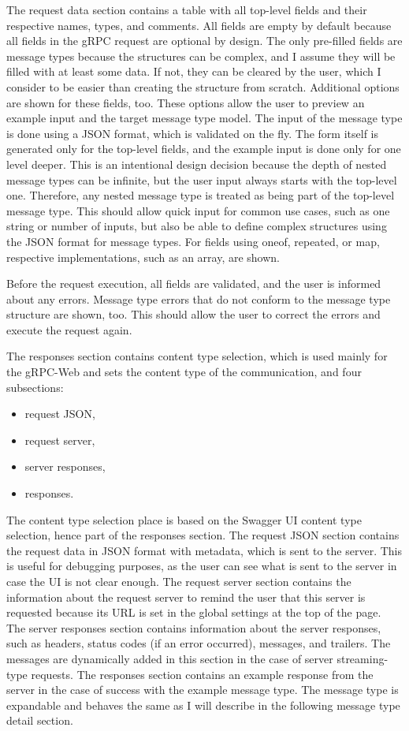 The request data section contains a table with all top-level fields and their respective names, types, and comments.
All fields are empty by default because all fields in the gRPC request are optional by design.
The only pre-filled fields are message types because the structures can be complex, and I assume they will be filled with at least some data.
If not, they can be cleared by the user, which I consider to be easier than creating the structure from scratch.
Additional options are shown for these fields, too.
These options allow the user to preview an example input and the target message type model.
The input of the message type is done using a JSON format, which is validated on the fly.
The form itself is generated only for the top-level fields, and the example input is done only for one level deeper.
This is an intentional design decision because the depth of nested message types can be infinite, but the user input always starts with the top-level one.
Therefore, any nested message type is treated as being part of the top-level message type.
This should allow quick input for common use cases, such as one string or number of inputs, but also be able to define complex structures using the JSON format for message types.
For fields using oneof, repeated, or map, respective implementations, such as an array, are shown.

Before the request execution, all fields are validated, and the user is informed about any errors.
Message type errors that do not conform to the message type structure are shown, too.
This should allow the user to correct the errors and execute the request again.

The responses section contains content type selection, which is used mainly for the gRPC-Web and sets the content type of the communication, and four subsections:
\begin{itemize}
    \item request JSON,
    \item request server,
    \item server responses,
    \item responses.
\end{itemize}

The content type selection place is based on the Swagger UI content type selection, hence part of the responses section.
The request JSON section contains the request data in JSON format with metadata, which is sent to the server.
This is useful for debugging purposes, as the user can see what is sent to the server in case the UI is not clear enough.
The request server section contains the information about the request server to remind the user that this server is requested because its URL is set in the global settings at the top of the page.
The server responses section contains information about the server responses, such as headers, status codes (if an error occurred), messages, and trailers.
The messages are dynamically added in this section in the case of server streaming-type requests.
The responses section contains an example response from the server in the case of success with the example message type.
The message type is expandable and behaves the same as I will describe in the following message type detail section.


